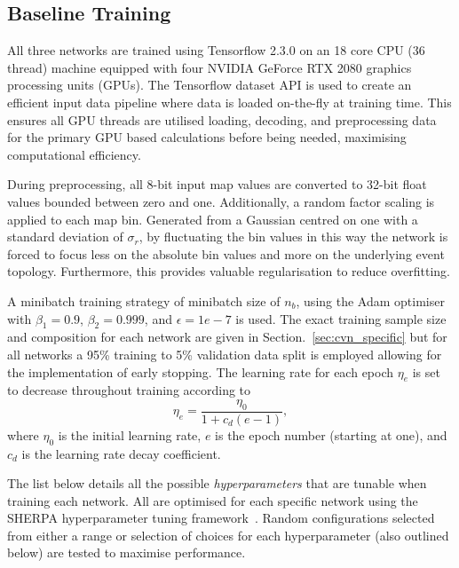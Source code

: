 \subsection{Baseline Training} %
\label{sec:cvn_baseline_training} %

All three networks are trained using Tensorflow 2.3.0 on an 18 core CPU (36 thread) machine
equipped with four NVIDIA GeForce RTX 2080 graphics processing units (GPUs). The Tensorflow
dataset API is used to create an efficient input data pipeline where data is loaded on-the-fly at
training time. This ensures all GPU threads are utilised loading, decoding, and preprocessing data
for the primary GPU based calculations before being needed, maximising computational efficiency.

During preprocessing, all 8-bit input map values are converted to 32-bit float values bounded
between zero and one. Additionally, a random factor scaling is applied to each map bin. Generated
from a Gaussian centred on one with a standard deviation of $\sigma_{r}$, by fluctuating the bin
values in this way the network is forced to focus less on the absolute bin values and more on the
underlying event topology. Furthermore, this provides valuable regularisation to reduce
overfitting.

A minibatch training strategy of minibatch size of $n_{b}$, using the Adam
optimiser~\cite{kingma2014} with $\beta_{1}=0.9$, $\beta_{2}=0.999$, and $\epsilon = 1e-7$ is
used. The exact training sample size and composition for each network are given in
Section.~\ref{sec:cvn_specific} but for all networks a 95\% training to 5\% validation data split
is employed allowing for the implementation of early stopping. The learning rate for each epoch
$\eta_{e}$ is set to decrease throughout training according to
\begin{equation}
    \eta_{e}=\frac{\eta_{0}}{1+c_{d}(e-1)},
\end{equation}
where $\eta_{0}$ is the initial learning rate, $e$ is the epoch number (starting at one), and
$c_{d}$ is the learning rate decay coefficient.

The list below details all the possible \emph{hyperparameters} that are tunable when training each
network. All are optimised for each specific network using the SHERPA hyperparameter tuning
framework~\cite{hertel2020}. Random configurations selected from either a range or selection of
choices for each hyperparameter (also outlined below) are tested to maximise performance.

